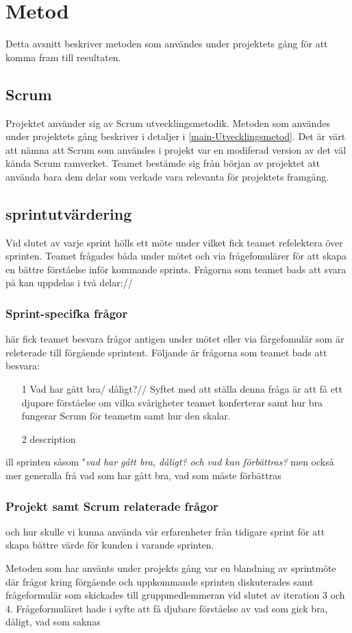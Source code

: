 \section{Metod}
\label{sec:Lieth_Wahid-method}
Detta avsnitt beskriver metoden som användes under projektets gång för att komma fram till resultaten.

\subsection{Scrum}
Projektet använder sig av Scrum utvecklingsmetodik. Metoden som användes under projektets gång beskriver i detaljer i  \ref{main-Utvecklingsmetod}. Det är värt att nämna att Scrum som användes i projekt var en modiferad version av det väl kända Scrum ramverket. Teamet bestämde sig från början av projektet att använda bara dem delar som verkade vara relevanta för projektets framgång.

\subsection{sprintutvärdering}
Vid slutet av varje sprint hölls ett  möte under vilket fick teamet refelektera över sprinten. Teamet frågades båda under mötet och via frågefomulärer för att skapa en bättre förståelse inför kommande sprints. Frågorna som teamet bads att svara på  kan uppdelas i två delar://
\subsubsection{Sprint-specifka frågor}
här fick teamet besvara frågor antigen under mötet eller via fårgefomulär som är releterade till förgående
sprintent. Följande är frågorna som teamet bads att besvara: 
\begin{enumerate}
	\item[1] Vad har gått bra/ dåligt?//
	Syftet med att ställa denna fråga är att få ett djupare förståelse om vilka svårigheter teamet konferterar samt hur bra fungerar Scrum för teametm samt hur den skalar. 
	\item[2] description 
\end{enumerate}

   ill sprinten såsom "\textit{vad har gått bra, dåligt? och vad kan förbättras? } men också mer generalla frå 
vad som har gått bra, vad som måste förbättras 
\subsubsection{Projekt samt Scrum relaterade frågor}
och hur skulle vi kunna använda vår erfarenheter från tidigare sprint för att skapa bättre värde för kunden i varande sprinten. 

\label{sec:Lieth_Wahid-Frågefromulär}

Metoden som har använts under projekts gång var en blandning av sprintmöte där frågor kring förgående och uppkommande sprinten diskuterades samt frågeformulär som skickades till gruppmedlemmeran vid slutet av iteration 3 och 4. Frågeformuläret hade i syfte att få djubare förståelse av vad som gick bra, dåligt, vad som saknas 

